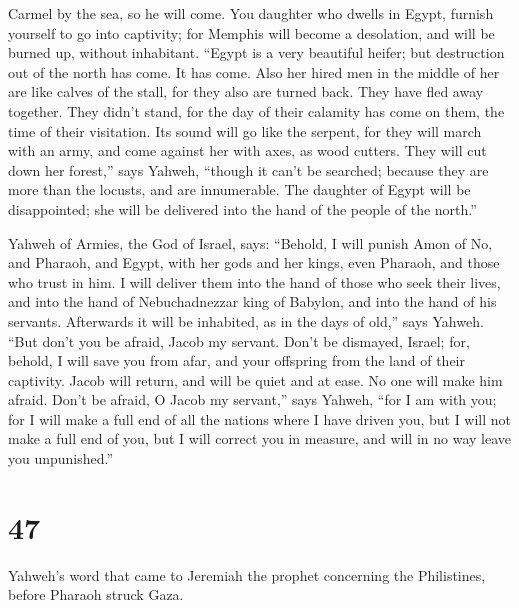 Carmel by the sea, so he will come.  You daughter who
dwells in Egypt, furnish yourself to go into captivity; for Memphis will
become a desolation, and will be burned up, without inhabitant.
 ``Egypt is a very beautiful heifer; but destruction out
of the north has come. It has come.  Also her hired men
in the middle of her are like calves of the stall, for they also are
turned back. They have fled away together. They didn't stand, for the
day of their calamity has come on them, the time of their visitation.
 Its sound will go like the serpent, for they will march
with an army, and come against her with axes, as wood cutters.
 They will cut down her forest,'' says Yahweh, ``though
it can't be searched; because they are more than the locusts, and are
innumerable.  The daughter of Egypt will be disappointed;
she will be delivered into the hand of the people of the north.''

 Yahweh of Armies, the God of Israel, says: ``Behold, I
will punish Amon of No, and Pharaoh, and Egypt, with her gods and her
kings, even Pharaoh, and those who trust in him.  I will
deliver them into the hand of those who seek their lives, and into the
hand of Nebuchadnezzar king of Babylon, and into the hand of his
servants. Afterwards it will be inhabited, as in the days of old,'' says
Yahweh.  ``But don't you be afraid, Jacob my servant.
Don't be dismayed, Israel; for, behold, I will save you from afar, and
your offspring from the land of their captivity. Jacob will return, and
will be quiet and at ease. No one will make him afraid. 
Don't be afraid, O Jacob my servant,'' says Yahweh, ``for I am with you;
for I will make a full end of all the nations where I have driven you,
but I will not make a full end of you, but I will correct you in
measure, and will in no way leave you unpunished.''

\hypertarget{section-46}{%
\section{47}\label{section-46}}

 Yahweh's word that came to Jeremiah the prophet
concerning the Philistines, before Pharaoh struck Gaza.

